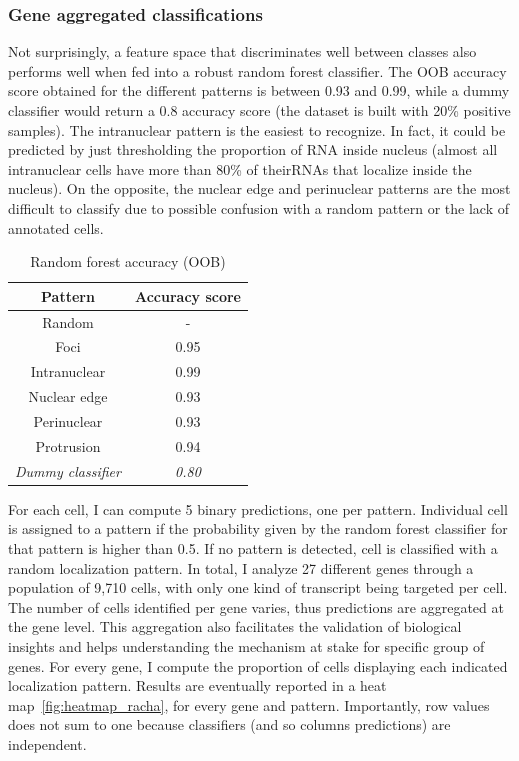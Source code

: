 \subsubsection{Gene aggregated classifications}

Not surprisingly, a feature space that discriminates well between classes also performs well when fed into a robust random forest classifier.
The \ac{OOB} accuracy score obtained for the different patterns is between 0.93 and 0.99, while a dummy classifier would return a 0.8 accuracy score (the dataset is built with 20\% positive samples).
The intranuclear pattern is the easiest to recognize.
In fact, it could be predicted by just thresholding the proportion of \ac{RNA} inside nucleus (almost all intranuclear cells have more than 80\% of their\ac{RNA}s that localize inside the nucleus).
On the opposite, the nuclear edge and perinuclear patterns are the most difficult to classify due to possible confusion with a random pattern or the lack of annotated cells.

\begin{table}
	\centering
	\begin{tabular}{| c | c |}
		\hline
		Pattern & Accuracy score\\
		\hline
		Random & -\\
		Foci & 0.95\\
		Intranuclear & 0.99\\
		Nuclear edge & 0.93\\
		Perinuclear & 0.93\\
		Protrusion & 0.94\\
		\hline
		\textit{Dummy classifier} & \textit{0.80}\\
		\hline
	\end{tabular}
	\caption[Random forest accuracy]{Random forest accuracy (OOB)}
	\label{table:accuracy_oob}
\end{table}

For each cell, I can compute 5 binary predictions, one per pattern.
Individual cell is assigned to a pattern if the probability given by the random forest classifier for that pattern is higher than 0.5.
If no pattern is detected, cell is classified with a random localization pattern.
In total, I analyze 27 different genes through a population of 9,710 cells, with only one kind of transcript being targeted per cell.
The number of cells identified per gene varies, thus predictions are aggregated at the gene level.
This aggregation also facilitates the validation of biological insights and helps understanding the mechanism at stake for specific group of genes.
For every gene, I compute the proportion of cells displaying each indicated localization pattern.
Results are eventually reported in a heat map~\ref{fig:heatmap_racha}, for every gene and pattern.
Importantly, row values does not sum to one because classifiers (and so columns predictions) are independent.

